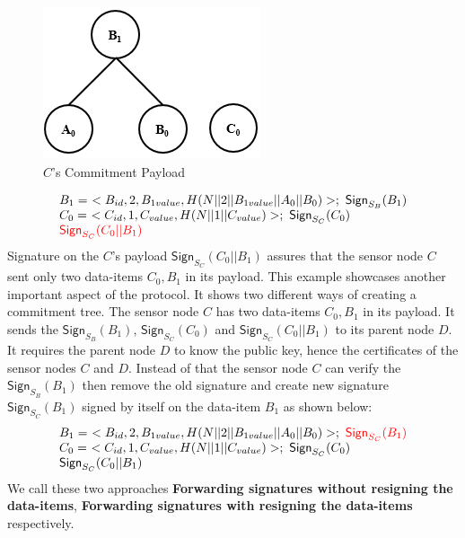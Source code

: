			\begin{figure}[h!]
				\centering
				\includegraphics[scale = 1]{images/commitment-payload-of-C.png}
				\caption{$C$'s Commitment Payload}
				\label{fig:Commitment payload of C}
			\end{figure}
		\begin{equation}	
			\begin{array}{l}
				B_{1} =\ <B_{id}, 2, B_{1value}, H(N||2||B_{1value}||A_{0}||B_{0})>;\ \textsf{Sign}_{S_{B}}(B_{1})\\
				C_{0} =\ <C_{id}, 1, C_{value}, H(N||1||C_{value})>;\ \textsf{Sign}_{S_{C}}(C_{0})\\
				\textcolor{red}{\textsf{Sign}_{S_{C}}(C_{0}||B_{1})}
			\end{array}
		\end{equation}
	Signature on the $C$'s payload $\textsf{Sign}_{S_{C}}(C_{0}||B_{1})$ assures that the sensor node $C$ sent only two data-items $C_{0},B_{1}$ in its payload.
	This example showcases another important aspect of the protocol.
	It shows two different ways of creating a commitment tree.
	The sensor node $C$ has two data-items $C_{0},B_{1}$ in its payload. 
	It sends the $\textsf{Sign}_{S_{B}}(B_{1})$, $\textsf{Sign}_{S_{C}}(C_{0}) $ and $\textsf{Sign}_{S_{C}}(C_{0}||B_{1})$ to its parent node $D$.
	It requires the parent node $D$ to know the public key, hence the certificates of the sensor nodes $C$ and $D$.
	Instead of that the sensor node $C$ can verify the $\textsf{Sign}_{S_{B}}(B_{1})$ then remove the old signature and create new signature $\textsf{Sign}_{S_{C}}(B_{1})$ signed by itself on the data-item $B_{1}$ as shown below:
\begin{equation}	
	\begin{array}{l}
		B_{1} =\ <B_{id}, 2, B_{1value}, H(N||2||B_{1value}||A_{0}||B_{0})>;\  \textcolor{red}{\textsf{Sign}_{S_{C}}(B_{1})}\\
		C_{0} =\ <C_{id}, 1, C_{value}, H(N||1||C_{value})>;\ \textsf{Sign}_{S_{C}}(C_{0})\\
		\textsf{Sign}_{S_{C}}(C_{0}||B_{1})
	\end{array}
\end{equation}
We call these two approaches \textbf{Forwarding signatures without resigning the data-items}, \textbf{Forwarding signatures with resigning the data-items} 
respectively.

